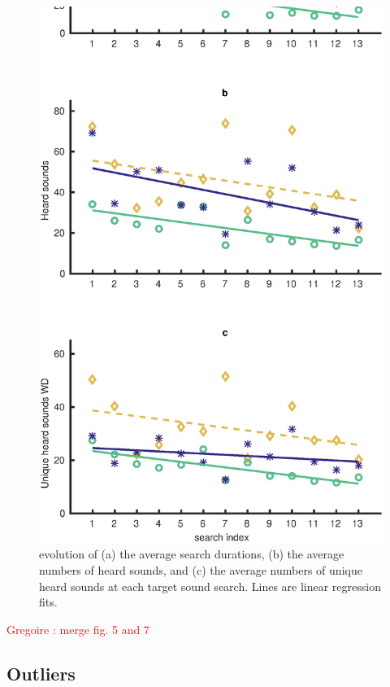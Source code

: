 \documentclass{aes2e}
\newcommand{\gl}[1]{\textcolor{red}{Gregoire : #1}}
\begin{document}
\begin{figure}[t]
\begin{center}
\includegraphics[scale=0.4]{gfx/analyse_music2.eps} 
\end{center}
\caption{\label{fig2Music} evolution of (a) the average search durations, (b) the average numbers of heard sounds, and (c) the average numbers of unique heard sounds at each target sound search. Lines are linear regression fits.}
\end{figure}

\gl{merge fig. 5 and 7}

\subsection{Outliers}
\end{document}
